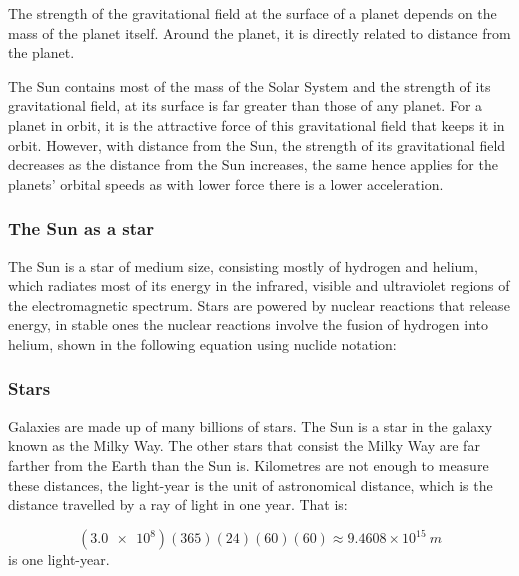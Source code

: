 The strength of the gravitational field at the surface of a planet depends on the mass of the 
planet itself. Around the planet, it is directly related to distance from the planet.

The Sun contains most of the mass of the Solar System and the strength of its gravitational field,
at its surface is far greater than those of any planet. For a planet in orbit, it is the attractive
force of this gravitational field that keeps it in orbit. However, with distance from the Sun, the
strength of its gravitational field decreases as the distance from the Sun increases, the same 
hence applies for the planets' orbital speeds as with lower force there is a lower acceleration.

\subsubsection{The Sun as a star}

The Sun is a star of medium size, consisting mostly of hydrogen and helium, which radiates most
of its energy in the infrared, visible and ultraviolet regions of the electromagnetic spectrum.
Stars are powered by nuclear reactions that release energy, in stable ones the nuclear reactions
involve the fusion of hydrogen into helium, shown in the following equation using nuclide notation:

\begin{center}
\end{center}

\subsubsection{Stars}

Galaxies are made up of many billions of stars. The Sun is a star in the galaxy known as the Milky
Way. The other stars that consist the Milky Way are far farther from the Earth than the Sun is.
Kilometres are not enough to measure these distances, the light-year is the unit of astronomical
distance, which is the distance travelled by a ray of light in one year. That is:

$$ (\num{3.0e8})(365)(24)(60)(60) \approx {9.4608 \times 10^{15}}\SI{ }{m} $$
is one light-year.

